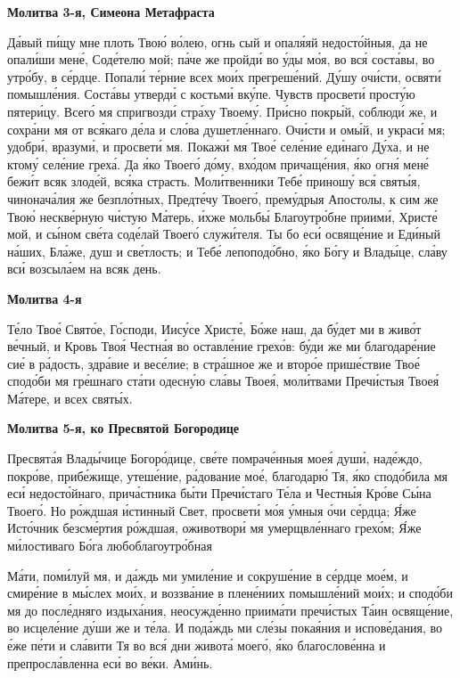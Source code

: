  

\bfseries Молитва 3-я, Симеона Метафраста\normalfont{}


   Да́вый пи́щу мне плоть Твою́ во́лею, огнь сый и опаля́яй недосто́йныя, да
не опали́ши мене́, Соде́телю мой; па́че же пройди́ во у́ды мо́я, во вся́ соста́вы,
во утро́бу, в се́рдце. Попали́ те́рние всех мои́х прегреше́ний. Ду́шу очи́сти,
освяти́ помышле́ния. Соста́вы утверди́ с костьми́ вку́пе. Чувств просвети́
просту́ю пятери́цу. Всего́ мя спригвозди́ стра́ху Твоему́. При́сно покры́й,
соблюди́ же, и сохра́ни мя от вся́каго де́ла и сло́ва душетле́ннаго. Очи́сти и
омы́й, и украси́ мя; удобри́, вразуми́, и просвети́ мя. Покажи́ мя Твое́ селе́ние
еди́наго Ду́ха, и не ктому́ селе́ние греха́. Да я́ко Твоего́ до́му, вхо́дом
причаще́ния, я́ко огня́ мене́ бежи́т всяк злоде́й, вся́ка страсть. Моли́твенники
Тебе́ приношу́ вся́ святы́я, чинонача́лия же безпло́тных, Предте́чу Твоего́,
прему́дрыя Апостолы, к сим же Твою́ нескве́рную чи́стую Ма́терь, и́хже
мольбы́ Благоутро́бне приими́, Христе́ мой, и сы́ном све́та соде́лай Твоего́
служи́теля. Ты бо еси́ освяще́ние и Еди́ный на́ших, Бла́же, душ и све́тлость;
и Тебе́ лепоподо́бно, я́ко Бо́гу и Влады́це, сла́ву вси́ возсыла́ем на всяк
день.



 

\bfseries Молитва 4-я\normalfont{}


   Те́ло Твое́ Свято́е, Го́споди, Иису́се Христе́, Бо́же наш, да бу́дет ми в
живо́т ве́чный, и Кровь Твоя́ Честна́я во оставле́ние грехо́в: бу́ди же ми
благодаре́ние сие́ в ра́дость, здра́вие и весе́лие; в стра́шное же и второ́е
прише́ствие Твое́ сподо́би мя гре́шнаго ста́ти одесну́ю сла́вы Твоея́,
моли́твами Пречи́стыя Твоея́ Ма́тере, и всех святы́х.



 

\bfseries Молитва 5-я, ко Пресвятой Богородице\normalfont{}


   Пресвята́я Влады́чице Богоро́дице, све́те помраче́нныя моея́ души́,
наде́ждо, покро́ве, прибе́жище, утеше́ние, ра́дование мое́, благодарю́ Тя, я́ко
сподо́била мя еси́ недосто́йнаго, прича́стника бы́ти Пречи́стаго Те́ла и
Честны́я Кро́ве Сы́на Твоего́. Но ро́ждшая и́стинный Свет, просвети́ мо́я
у́мныя о́чи се́рдца; Я́же Исто́чник безсме́ртия ро́ждшая, оживотвори́ мя
умерщвле́ннаго грехо́м; Я́же ми́лостиваго Бо́га любоблагоутро́бная

Ма́ти, поми́луй мя, и да́ждь ми умиле́ние и сокруше́ние в се́рдце мое́м,
и смире́ние в мы́слех мои́х, и воззва́ние в плене́ниих помышле́ний
мои́х; и сподо́би мя до после́дняго издыха́ния, неосужде́нно приима́ти
пречи́стых Та́ин освяще́ние, во исцеле́ние ду́ши же и те́ла. И пода́ждь ми
сле́зы покая́ния и испове́дания, во е́же пе́ти и сла́вити Тя во вся́ дни
живота́ моего́, я́ко благослове́нна и препросла́вленна еси́ во ве́ки.
Ами́нь.



